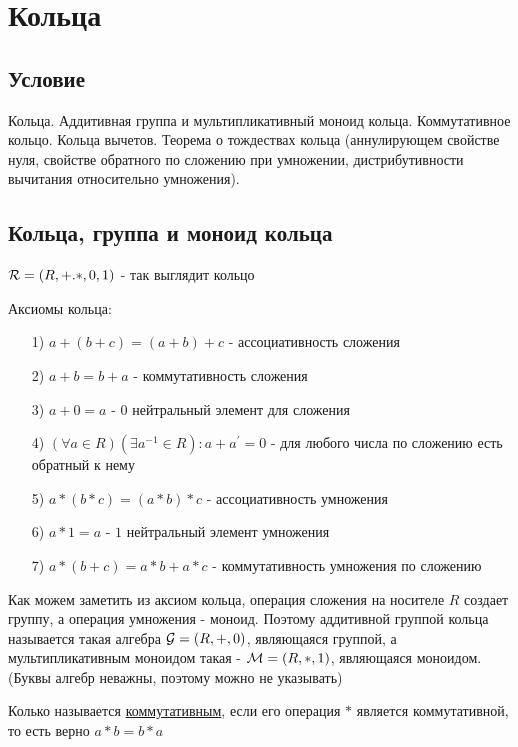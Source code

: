 \documentclass{report}
\begin{document}
\newpage

\section{Кольца}
\subsection{Условие}
Кольца. Аддитивная группа и мультипликативный моноид кольца. Коммутативное
кольцо. Кольца вычетов. Теорема о тождествах кольца (аннулирующем свойстве нуля,
свойстве обратного по сложению при умножении, дистрибутивности вычитания
относительно умножения).

\subsection{Кольца, группа и моноид кольца}
${\cal R} = (R, +. *, 0, 1)$ - так выглядит кольцо

\medskip

Аксиомы кольца:
\begin{itemize}
    \item[1)] $a + (b + c) = (a + b) + c$ - ассоциативность сложения
    \item[2)] $a + b = b + a$ - коммутативность сложения
    \item[3)] $a + 0 = a$ - $0$ нейтральный элемент для сложения
    \item[4)] $(\forall a \in R)(\exists a^{-1} \in R): a + a^{\prime} = 0$ - для любого числа по сложению есть обратный к нему
    \item[5)] $a * (b * c) = (a * b) * c$ - ассоциативность умножения
    \item[6)] $a * 1 = a$ - $1$ нейтральный элемент умножения
    \item[7)] $a*(b+c) = a*b + a*c$ - коммутативность умножения по сложению
\end{itemize}

\medskip

Как можем заметить из аксиом кольца, операция сложения на носителе $R$ создает группу,
а операция умножения - моноид. Поэтому аддитивной группой кольца называется такая алгебра
${\cal G} = (R, +, 0)$, являющаяся группой, а мультипликативным моноидом такая -
${\cal M} = (R, *, 1)$, являющаяся моноидом. (Буквы алгебр неважны, поэтому можно не указывать)

\medskip

Колько называется \underline{коммутативным}, если его операция $*$ является
коммутативной, то есть верно $a * b = b * a$
\end{document}
